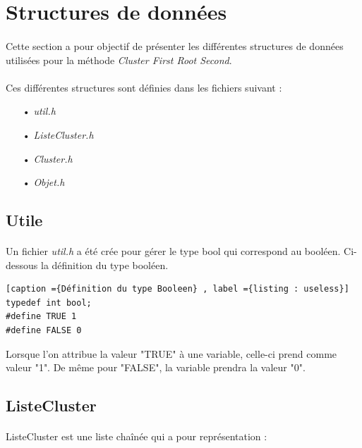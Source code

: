 \documentclass[twoside,UTF8]{EPURapport}
\begin{document}
\section{Structures de données}
\label{subsec:struct}

\paragraph{} Cette section a pour objectif de présenter les différentes structures de données utilisées pour la méthode \textit{Cluster First Root Second}.

\paragraph{}Ces différentes structures sont définies dans les fichiers suivant : 
\begin{itemize}
\item[•] \textit{util.h}
\item[•]\textit{ListeCluster.h}
\item[•]\textit{Cluster.h}
\item[•]\textit{Objet.h}
\end{itemize}

\subsection{Utile}
\label{subsec:util.h}

\paragraph{}
Un fichier \textit{util.h} a été crée pour gérer le type bool qui correspond au booléen. 
Ci-dessous la définition du type booléen. 
\begin{lstlisting}[caption ={Définition du type Booleen} , label ={listing : useless}]
typedef int bool;
#define TRUE 1
#define FALSE 0
\end{lstlisting}

Lorsque l'on attribue la valeur "TRUE" à une variable, celle-ci prend comme valeur "1". De m\^eme pour "FALSE", la variable prendra la valeur "0".


\subsection{ListeCluster}

\paragraph{}
ListeCluster est une liste cha\^inée qui a pour représentation :
\end{document}
